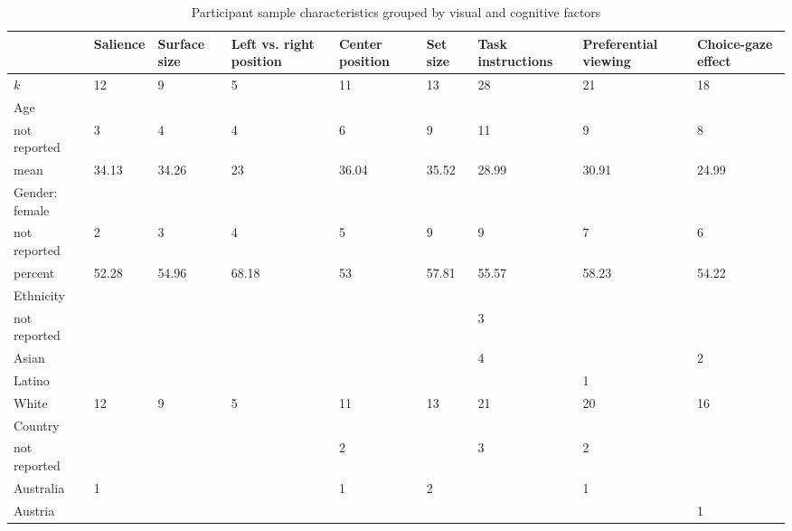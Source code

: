 \begin{table}[ht]
\centering
\caption{Participant sample characteristics grouped by visual and cognitive factors} 
\label{tab:sampleTable}
\begingroup\small
\begin{tabular}{lp{.07\linewidth}p{.07\linewidth}p{.09\linewidth}p{.09\linewidth}p{.07\linewidth}p{.08\linewidth}p{.1\linewidth}p{.07\linewidth}}
  \hline
  & Salience & Surface size & Left vs. right position & Center position & Set size & Task instructions & Preferential viewing & Choice-gaze effect \\ 
  \hline
$k$ & 12 & 9 & 5 & 11 & 13 & 28 & 21 & 18 \\ 
  Age &  &  &  &  &  &  &  &  \\ 
  \hspace{2mm}not reported & 3 & 4 & 4 & 6 & 9 & 11 & 9 & 8 \\ 
  \hspace{2mm}mean & 34.13 & 34.26 & 23 & 36.04 & 35.52 & 28.99 & 30.91 & 24.99 \\ 
  Gender: female &  &  &  &  &  &  &  &  \\ 
  \hspace{2mm}not reported & 2 & 3 & 4 & 5 & 9 & 9 & 7 & 6 \\ 
  \hspace{2mm}percent & 52.28 & 54.96 & 68.18 & 53 & 57.81 & 55.57 & 58.23 & 54.22 \\ 
  Ethnicity &  &  &  &  &  &  &  &  \\ 
  \hspace{2mm}not reported &  &  &  &  &  & 3 &  &  \\ 
  \hspace{2mm}Asian &  &  &  &  &  & 4 &  & 2 \\ 
  \hspace{2mm}Latino &  &  &  &  &  &  & 1 &  \\ 
  \hspace{2mm}White & 12 & 9 & 5 & 11 & 13 & 21 & 20 & 16 \\ 
  Country &  &  &  &  &  &  &  &  \\ 
  \hspace{2mm}not reported &  &  &  & 2 &  & 3 & 2 &  \\ 
  \hspace{2mm}Australia & 1 &  &  & 1 & 2 &  & 1 &  \\ 
  \hspace{2mm}Austria &  &  &  &  &  &  &  & 1 \\ 

\end{tabular}
\end{table}
